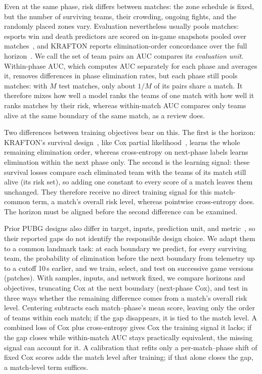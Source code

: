 \documentclass[sigconf,anonymous,nonacm]{acmart}
\begin{document}
Even at the same phase, risk differs between matches: the zone schedule is fixed, but the number of surviving teams, their crowding, ongoing fights, and the randomly placed zones vary. Evaluation nevertheless usually pools matches: esports win and death predictors are scored on in-game snapshots pooled over matches~\cite{Hodge21,Katona19,Marshall22}, and KRAFTON reports elimination-order concordance over the full horizon~\cite{KRAFTON}. We call the set of team pairs an AUC compares its \emph{evaluation unit}. Within-phase AUC, which computes AUC separately for each phase and averages it, removes differences in phase elimination rates, but each phase still pools matches: with $M$ test matches, only about $1/M$ of its pairs share a match. It therefore mixes how well a model ranks the teams of one match with how well it ranks matches by their risk, whereas within-match AUC compares only teams alive at the same boundary of the same match, as a review does.

Two differences between training objectives bear on this. The first is the horizon: KRAFTON's survival design~\cite{KRAFTON}, like Cox partial likelihood~\cite{Cox72}, learns the whole remaining elimination order, whereas cross-entropy on next-phase labels learns elimination within the next phase only. The second is the learning signal: these survival losses compare each eliminated team with the teams of its match still alive (its risk set), so adding one constant to every score of a match leaves them unchanged. They therefore receive no direct training signal for this match-common term, a match's overall risk level, whereas pointwise cross-entropy does. The horizon must be aligned before the second difference can be examined.

Prior PUBG designs also differ in target, inputs, prediction unit, and metric~\cite{Sagong25a,KRAFTON}, so their reported gaps do not identify the responsible design choice. We adapt them to a common landmark task: at each boundary we predict, for every surviving team, the probability of elimination before the next boundary from telemetry up to a cutoff 10\,s earlier, and we train, select, and test on successive game versions (patches). With samples, inputs, and network fixed, we compare horizons and objectives, truncating Cox at the next boundary (next-phase Cox), and test in three ways whether the remaining difference comes from a match's overall risk level. Centering subtracts each match--phase's mean score, leaving only the order of teams within each match; if the gap disappears, it is tied to the match level. A combined loss of Cox plus cross-entropy gives Cox the training signal it lacks; if the gap closes while within-match AUC stays practically equivalent, the missing signal can account for it. A calibration that refits only a per-match--phase shift of fixed Cox scores adds the match level after training; if that alone closes the gap, a match-level term suffices.
\end{document}
